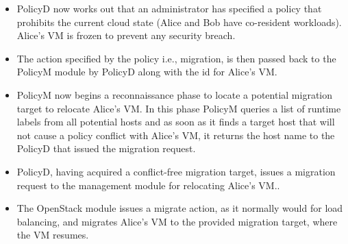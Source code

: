 \begin{itemize}
\item PolicyD now works out that an administrator has specified a policy
that prohibits the current cloud state (Alice and Bob have co-resident workloads).  Alice's VM is frozen to prevent 
any security breach.

\item The action specified by the policy i.e., migration, is then passed back
to the PolicyM module by PolicyD along with the id for Alice's VM.

\item PolicyM now begins a reconnaissance phase to locate a potential migration target
to relocate Alice's VM.  In this phase PolicyM queries a list of runtime
labels from all potential hosts and as soon as it finds a target host that
will not cause a policy conflict with Alice's VM, it returns the host name
to the PolicyD that issued the migration request.

\item PolicyD, having acquired a conflict-free migration target, issues a
migration request to the management module for relocating Alice's VM..

\item The OpenStack module issues a migrate action, as it normally would for
load balancing, and migrates Alice's VM to the provided migration target,
where the VM resumes.


\end{itemize}

